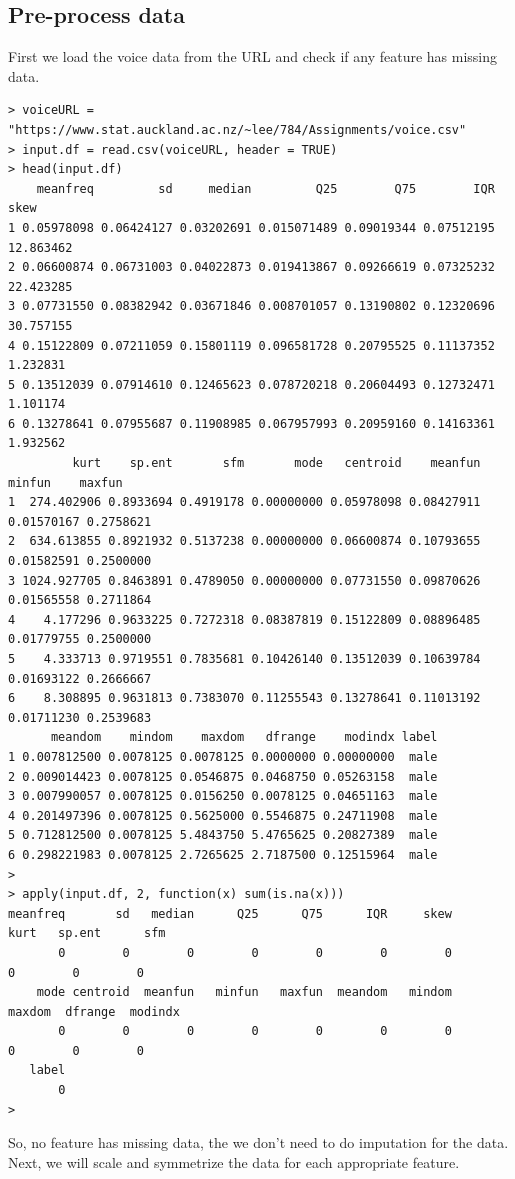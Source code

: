 \documentclass{article}%
\begin{document}
\subsection{Pre-process data}
First we load the voice data from the URL and check if any feature has missing data.
\begin{verbatim}
> voiceURL = "https://www.stat.auckland.ac.nz/~lee/784/Assignments/voice.csv"
> input.df = read.csv(voiceURL, header = TRUE)
> head(input.df)
    meanfreq         sd     median         Q25        Q75        IQR      skew
1 0.05978098 0.06424127 0.03202691 0.015071489 0.09019344 0.07512195 12.863462
2 0.06600874 0.06731003 0.04022873 0.019413867 0.09266619 0.07325232 22.423285
3 0.07731550 0.08382942 0.03671846 0.008701057 0.13190802 0.12320696 30.757155
4 0.15122809 0.07211059 0.15801119 0.096581728 0.20795525 0.11137352  1.232831
5 0.13512039 0.07914610 0.12465623 0.078720218 0.20604493 0.12732471  1.101174
6 0.13278641 0.07955687 0.11908985 0.067957993 0.20959160 0.14163361  1.932562
         kurt    sp.ent       sfm       mode   centroid    meanfun     minfun    maxfun
1  274.402906 0.8933694 0.4919178 0.00000000 0.05978098 0.08427911 0.01570167 0.2758621
2  634.613855 0.8921932 0.5137238 0.00000000 0.06600874 0.10793655 0.01582591 0.2500000
3 1024.927705 0.8463891 0.4789050 0.00000000 0.07731550 0.09870626 0.01565558 0.2711864
4    4.177296 0.9633225 0.7272318 0.08387819 0.15122809 0.08896485 0.01779755 0.2500000
5    4.333713 0.9719551 0.7835681 0.10426140 0.13512039 0.10639784 0.01693122 0.2666667
6    8.308895 0.9631813 0.7383070 0.11255543 0.13278641 0.11013192 0.01711230 0.2539683
      meandom    mindom    maxdom   dfrange    modindx label
1 0.007812500 0.0078125 0.0078125 0.0000000 0.00000000  male
2 0.009014423 0.0078125 0.0546875 0.0468750 0.05263158  male
3 0.007990057 0.0078125 0.0156250 0.0078125 0.04651163  male
4 0.201497396 0.0078125 0.5625000 0.5546875 0.24711908  male
5 0.712812500 0.0078125 5.4843750 5.4765625 0.20827389  male
6 0.298221983 0.0078125 2.7265625 2.7187500 0.12515964  male
>
> apply(input.df, 2, function(x) sum(is.na(x)))
meanfreq       sd   median      Q25      Q75      IQR     skew     kurt   sp.ent      sfm
       0        0        0        0        0        0        0        0        0        0
    mode centroid  meanfun   minfun   maxfun  meandom   mindom   maxdom  dfrange  modindx
       0        0        0        0        0        0        0        0        0        0
   label
       0
> \end{verbatim}
So, no feature has missing data, the we don't need to do imputation for the data. Next, we will scale and symmetrize the data for each appropriate feature.
\end{document}
